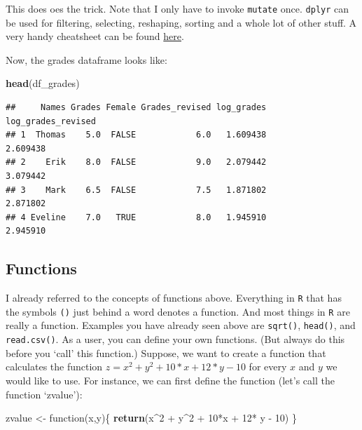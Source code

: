 \documentclass[]{article}
\newenvironment{Shaded}{\begin{snugshade}}{\end{snugshade}}
\newcommand{\KeywordTok}[1]{\textcolor[rgb]{0.13,0.29,0.53}{\textbf{{#1}}}}
\newcommand{\DecValTok}[1]{\textcolor[rgb]{0.00,0.00,0.81}{{#1}}}
\newcommand{\StringTok}[1]{\textcolor[rgb]{0.31,0.60,0.02}{{#1}}}
\newcommand{\NormalTok}[1]{{#1}}
\theoremstyle{definition}
\theoremstyle{definition}
\theoremstyle{definition}
\theoremstyle{remark}
\begin{document}
This does oes the trick. Note that I only have to invoke \texttt{mutate}
once. \texttt{dplyr} can be used for filtering, selecting, reshaping,
sorting and a whole lot of other stuff. A very handy cheatsheet can be
found
\href{https://www.rstudio.com/wp-content/uploads/2015/02/data-wrangling-cheatsheet.pdf}{here}.

Now, the grades dataframe looks like:

\begin{Shaded}
\begin{Highlighting}[]
\KeywordTok{head}\NormalTok{(df_grades)}
\end{Highlighting}
\end{Shaded}

\begin{verbatim}
##     Names Grades Female Grades_revised log_grades log_grades_revised
## 1  Thomas    5.0  FALSE            6.0   1.609438           2.609438
## 2    Erik    8.0  FALSE            9.0   2.079442           3.079442
## 3    Mark    6.5  FALSE            7.5   1.871802           2.871802
## 4 Eveline    7.0   TRUE            8.0   1.945910           2.945910
\end{verbatim}

\subsection{Functions}\label{functions}

I already referred to the concepts of functions above. Everything in
\texttt{R} that has the symbols \texttt{()} just behind a word denotes a
function. And most things in \texttt{R} are really a function. Examples
you have already seen above are \texttt{sqrt()}, \texttt{head()}, and
\texttt{read.csv()}. As a user, you can define your own functions. (But
always do this before you `call' this function.) Suppose, we want to
create a function that calculates the function
\(z = x^2 + y^2 + 10*x + 12* y - 10\) for every \(x\) and \(y\) we would
like to use. For instance, we can first define the function (let's call
the function `zvalue'):

\begin{Shaded}
\begin{Highlighting}[]
\NormalTok{zvalue <-}\StringTok{ }\NormalTok{function(x,y)\{}
  \KeywordTok{return}\NormalTok{(x^}\DecValTok{2} \NormalTok{+}\StringTok{ }\NormalTok{y^}\DecValTok{2} \NormalTok{+}\StringTok{ }\DecValTok{10}\NormalTok{*x +}\StringTok{ }\DecValTok{12}\NormalTok{*}\StringTok{ }\NormalTok{y -}\StringTok{ }\DecValTok{10}\NormalTok{)}
\NormalTok{\}}
\end{Highlighting}
\end{Shaded}
\end{document}
